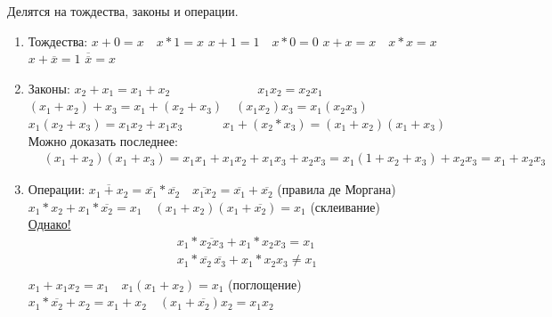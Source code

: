 \documentclass[a4paper,12pt]{report}
\begin{document}
Делятся на тождества, законы и операции.
\begin{enumerate}

\item Тождества: 
  $x+0=x \quad x*1=x$
  $x+1=1 \quad x*0=0$
 $x+x=x \quad x*x=x$ 
 $x+\overline{x}=1$ 
  $\overline{\overline{x}}=x$

\item Законы: 
 $x_2+x_1=x_1+x_2 \qquad\qquad\qquad\quad  x_1x_2=x_2x_1$
 $(x_1+x_2)+x_3=x_1+(x_2+x_3) \quad  (x_1x_2)x_3=x_1(x_2x_3)$
 $x_1(x_2+x_3)=x_1x_2+x_1x_3 \quad\quad\quad \ x_1+(x_2*x_3)=(x_1+x_2)(x_1+x_3)$ \\
Можно доказать последнее: 
\begin{equation*}
	\begin{aligned}
		&(x_1+x_2)(x_1+x_3)=x_1x_1+x_1x_2+x_1x_3+x_2x_3=x_1(1+x_2+x_3)+x_2x_3=x_1+x_2x_3
	\end{aligned}
\end{equation*}
\item Операции:
 $\overline{x_1+x_2}=\overline{x_1}*\overline{x_2} \quad \overline{x_1x_2}=\overline{x_1}+\overline{x_2}$  (правила де Моргана)
 $x_1*x_2+x_1*\overline{x_2}=x_1 \quad (x_1+x_2)(x_1+\overline{x_2})=x_1$ (склеивание)\\

\underline{Однако!}
\begin{equation*}
	\begin{aligned}
		& x_1*\overline{x_2x_3}+x_1*x_2x_3=x_1\\
		& x_1*\overline{x_2}\,\overline{x_3}+x_1*x_2x_3 \not = x_1 \\
	\end{aligned}
\end{equation*}
 $x_1+x_1x_2=x_1 \quad x_1(x_1+x_2)=x_1$  (поглощение)
 $x_1*\overline{x_2}+x_2=x_1+x_2 \quad (x_1+\overline{x_2})x_2=x_1x_2$
\end{enumerate}			
\newpage

	
\end{document}
